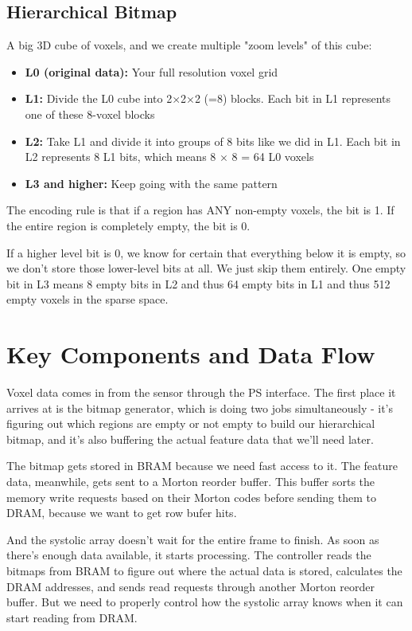 \documentclass[12pt]{article}
\begin{document}
\subsection{Hierarchical Bitmap}

A big 3D cube of voxels, and we create multiple "zoom levels" of this cube:

\begin{itemize}
    \item \textbf{L0 (original data):} Your full resolution voxel grid
    \item \textbf{L1:} Divide the L0 cube into 2×2×2 (=8) blocks. Each bit in L1 represents one of these 8-voxel blocks
    \item \textbf{L2:} Take L1 and divide it into groups of 8 bits like we did in L1. Each bit in L2 represents 8 L1 bits, which means 8 $\times$ 8 = 64 L0 voxels
    \item \textbf{L3 and higher:} Keep going with the same pattern
\end{itemize}

The encoding rule is that if a region has ANY non-empty voxels, the bit is 1. If the entire region is completely empty, the bit is 0.

If a higher level bit is 0, we know for certain that everything below it is empty, so we don't store those lower-level bits at all. We just skip them entirely. One empty bit in L3 means 8 empty bits in L2 and thus 64 empty bits in L1 and thus 512 empty voxels in the sparse space.

\section{Key Components and Data Flow}

Voxel data comes in from the sensor through the PS interface. The first place it arrives at is the bitmap generator, which is doing two jobs simultaneously - it's figuring out which regions are empty or not empty to build our hierarchical bitmap, and it's also buffering the actual feature data that we'll need later.

The bitmap gets stored in BRAM because we need fast access to it. The feature data, meanwhile, gets sent to a Morton reorder buffer. This buffer sorts the memory write requests based on their Morton codes before sending them to DRAM, because we want to get row bufer hits.

And the systolic array doesn't wait for the entire frame to finish. As soon as there's enough data available, it starts processing. The controller reads the bitmaps from BRAM to figure out where the actual data is stored, calculates the DRAM addresses, and sends read requests through another Morton reorder buffer. But we need to properly control how the systolic array knows when it can start reading from DRAM.
\end{document}
